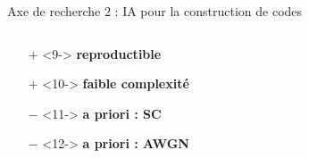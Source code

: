 \documentclass[t,compress,mathserif,12pt,xcolor=dvipsnames]{beamer}
\newcommand{\RED} [1]{\textcolor{Paired-5}{\textbf{#1}}}
\newcommand{\GREEN} [1]{\textcolor{Paired-3}{\textbf{#1}}}
\begin{document}
\begin{frame}[t]{Axe de recherche 2 : IA pour la construction de codes}
  \begin{minipage}[t][5.0cm][t]{\textwidth}
    \begin{columns}[T]
      \begin{column}{0.45\textwidth}
        \vspace*{-1.1cm}
        \begin{center}
        \end{center}
        \vspace*{-1cm}
        \small{
        \begin{itemize}
          \setlength\itemsep{-0.5em}
          \item[\GREEN{$+$}]<9-> \GREEN{reproductible}
          \item[\GREEN{$+$}]<10-> \GREEN{faible complexité}
          \item[\RED{$-$}]  <11-> \RED  {a priori : SC}
          \item[\RED{$-$}]  <12-> \RED  {a priori : AWGN}

\end{itemize}}
\end{column}
\end{columns}
\end{minipage}
\end{frame}
\end{document}
